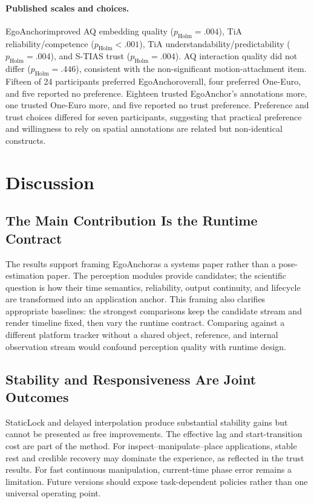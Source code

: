 \documentclass[review]{vgtc}
\newcommand{\system}{EgoAnchor}
\begin{document}
\paragraph{Published scales and choices.}
\system improved AQ embedding quality ($p_{\mathrm{Holm}}=.004$), TiA reliability/competence ($p_{\mathrm{Holm}}<.001$), TiA understandability/predictability ($p_{\mathrm{Holm}}=.004$), and S-TIAS trust ($p_{\mathrm{Holm}}=.004$). AQ interaction quality did not differ ($p_{\mathrm{Holm}}=.446$), consistent with the non-significant motion-attachment item. Fifteen of 24 participants preferred \system overall, four preferred One-Euro, and five reported no preference. Eighteen trusted \system's annotations more, one trusted One-Euro more, and five reported no trust preference. Preference and trust choices differed for seven participants, suggesting that practical preference and willingness to rely on spatial annotations are related but non-identical constructs.

\section{Discussion}
\subsection{The Main Contribution Is the Runtime Contract}
The results support framing \system as a systems paper rather than a pose-estimation paper. The perception modules provide candidates; the scientific question is how their time semantics, reliability, output continuity, and lifecycle are transformed into an application anchor. This framing also clarifies appropriate baselines: the strongest comparisons keep the candidate stream and render timeline fixed, then vary the runtime contract. Comparing against a different platform tracker without a shared object, reference, and internal observation stream would confound perception quality with runtime design.

\subsection{Stability and Responsiveness Are Joint Outcomes}
StaticLock and delayed interpolation produce substantial stability gains but cannot be presented as free improvements. The effective lag and start-transition cost are part of the method. For inspect--manipulate--place applications, stable rest and credible recovery may dominate the experience, as reflected in the trust results. For fast continuous manipulation, current-time phase error remains a limitation. Future versions should expose task-dependent policies rather than one universal operating point.
\end{document}
